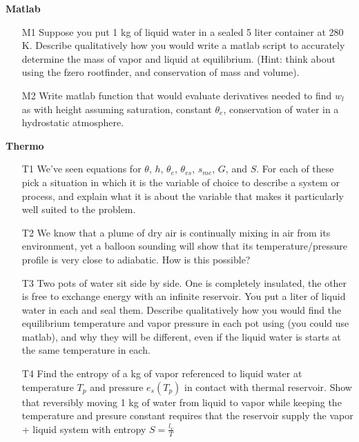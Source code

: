 \documentclass[12pt]{article}
\begin{document}
\textbf{Matlab}

\begin{enumerate}
\item[M1]  Suppose you put 1 kg of liquid water in a sealed 5 liter container 
at 280 K.  Describe qualitatively how you would write a matlab
script to  accurately determine the mass of vapor and liquid at
equilibrium.  (Hint:  think about using the fzero rootfinder, and
conservation of mass and volume).


\item[M2] Write matlab function that would evaluate derivatives needed to
find  $w_l$ as with height assuming saturation, constant $\theta_e$,
conservation of water in a hydrostatic atmosphere.


\end{enumerate}

\textbf{Thermo}

\begin{enumerate}
\item[T1]  We've seen equations for $\theta$, $h$, $\theta_e$, $\theta_{es}$, $s_{me}$, $G$,
and $S$.  For each of these pick a situation in which it is the variable of choice to
describe a system or process, and explain what it is about the variable that makes it
particularly well suited to the problem.


\item[T2]  We know that a plume of dry air is continually mixing in air from its environment,
yet a balloon sounding will show that its temperature/pressure profile is very close
to adiabatic.  How is this possible?

\item[T3]  Two pots of water sit side by side.  One is completely
insulated, the other is free to exchange energy with an
infinite reservoir.  You put a liter of liquid water in each and
seal them.   Describe qualitatively how you would find the
equilibrium temperature and vapor pressure in each pot using
(you could use matlab), and why they will be different, even if
the liquid water is starts at the same temperature in each.


\item[T4] Find the entropy of a kg of vapor
referenced to liquid water  at temperature $T_p$ and pressure $e_s(T_p)$ in
contact with thermal reservoir.  Show that reversibly moving 1 kg
of water from liquid to vapor while keeping the temperature
and presure constant requires that the reservoir supply
the vapor + liquid system with entropy $S=\frac{ l_v}{T}$



\end{enumerate}
\end{document}
